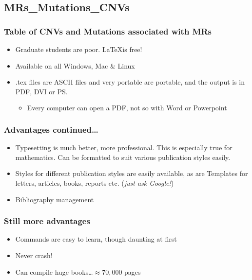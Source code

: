 \documentclass{beamer}
\begin{document}
\subsection{MRs_Mutations_CNVs}
\begin{frame}
   \frametitle{Table of CNVs and Mutations associated with MRs}
   
   \begin{itemize}
      \item Graduate students are poor.  \LaTeX is free!
      
      \item Available on all Windows, Mac \& Linux
      
      \item .tex files are ASCII files and very portable are portable, and the output is in PDF, DVI or PS.
      \begin{itemize}
         \item Every computer can open a PDF, not so with Word or Powerpoint
      \end{itemize}
   \end{itemize}
\end{frame}
\begin{frame}
   \frametitle{Advantages continued\ldots}
   \begin{itemize}
      \item Typesetting is much better, more professional.  This is especially true for mathematics.  Can be formatted to suit various publication styles easily.
      
      \item Styles for different publication styles are easily available, as are Templates for letters, articles, books, reports etc. (\emph{just ask Google!})
      
      \item Bibliography management
   \end{itemize}

\end{frame}
\begin{frame}
   \frametitle{Still more advantages}
   \begin{itemize}
      \item Commands are easy to learn, though daunting at first
      
      \item Never crash!
      
      \item Can compile huge books\ldots $\approx70,000$ pages
   \end{itemize}

\end{frame}
\end{document}
